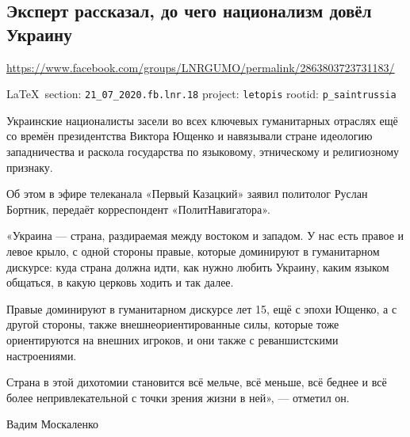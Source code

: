  
 
  
\subsection{Эксперт рассказал, до чего национализм довёл Украину}
\label{sec:21_07_2020.fb.lnr.18}
\url{https://www.facebook.com/groups/LNRGUMO/permalink/2863803723731183/}

\vspace{0.5cm}
{\small\LaTeX~section: \verb|21_07_2020.fb.lnr.18| project: \verb|letopis| rootid: \verb|p_saintrussia|}
\vspace{0.5cm}

Украинские националисты засели во всех ключевых гуманитарных отраслях ещё со
времён президентства Виктора Ющенко и навязывали стране идеологию западничества
и раскола государства по языковому, этническому и религиозному признаку.

Об этом в эфире телеканала «Первый Казацкий» заявил политолог Руслан Бортник,
передаёт корреспондент «ПолитНавигатора».

«Украина --- страна, раздираемая между востоком и западом. У нас есть правое и
левое крыло, с одной стороны правые, которые доминируют в гуманитарном
дискурсе: куда страна должна идти, как нужно любить Украину, каким языком
общаться, в какую церковь ходить и так далее.

Правые доминируют в гуманитарном дискурсе лет 15, ещё с эпохи Ющенко, а с
другой стороны, также внешнеориентированные силы, которые тоже ориентируются на
внешних игроков, и они также с реваншистскими настроениями.

Страна в этой дихотомии становится всё мельче, всё меньше, всё беднее и всё
более непривлекательной с точки зрения жизни в ней», --- отметил он.

Вадим Москаленко
